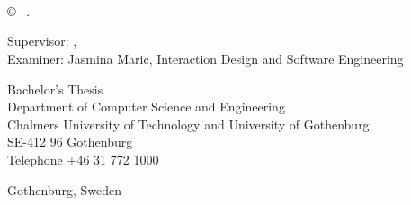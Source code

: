 \newpage
\thispagestyle{plain}
\vspace*{4.5cm}
\oneLineTitle\\
\oneLineSubtitle\\
\MARTINT{} \setlength{\parskip}{1cm}
\FELIXT{} \setlength{\parskip}{1cm}
\HANNEST{} \setlength{\parskip}{1cm}
\\
\MARCUST{} \setlength{\parskip}{1cm}
\JAKOBT{} \setlength{\parskip}{1cm}

\copyright ~ \MEMBERTILDELIST{} \the\year. \setlength{\parskip}{1cm}

Supervisor: \supervisor, \supervisordepartment\\
Examiner: Jasmina Maric, Interaction Design and Software Engineering \setlength{\parskip}{1cm}

Bachelor's Thesis \the\year\\	%
Department of Computer Science and Engineering\\
Chalmers University of Technology and University of Gothenburg\\
SE-412 96 Gothenburg\\
Telephone +46 31 772 1000 \setlength{\parskip}{0.5cm}

\vfill


Gothenburg, Sweden \the\year

